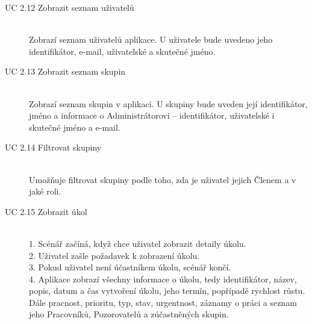\documentclass[thesis=B,czech]{FITthesis}[2012/06/26]
\begin{document}
\begin{description}
				\item[UC 2.12 Zobrazit seznam uživatelů] \hfill \\
					Zobrazí seznam uživatelů aplikace. U uživatele bude uvedeno jeho identifikátor, e-mail, uživatelské a skutečné jméno.
					
				\item[UC 2.13 Zobrazit seznam skupin] \hfill \\
					Zobrazí seznam skupin v aplikaci. U skupiny bude uveden její identifikátor, jméno a informace o Administrátorovi -- identifikátor, uživatelské i skutečné jméno a e-mail.
					
				\item[UC 2.14 Filtrovat skupiny] \hfill \\
					Umožňuje filtrovat skupiny podle toho, zda je uživatel jejich Členem a v jaké roli.
					
				\item[UC 2.15 Zobrazit úkol] \hfill \\
					1. Scénář začíná, když chce uživatel zobrazit detaily úkolu. \\
					2. Uživatel zašle požadavek k zobrazení úkolu. \\
					3. Pokud uživatel není účastníkem úkolu, scénář končí.  \\
					4. Aplikace zobrazí všechny informace o úkolu, tedy identifikátor, název, popis, datum a čas vytvoření úkolu, jeho termín, popřípadě rychlost růstu. Dále pracnost, prioritu, typ, stav, urgentnost, záznamy o práci a seznam jeho Pracovníků, Pozorovatelů a zúčastněných skupin. \\
					

\end{description}
\end{document}
